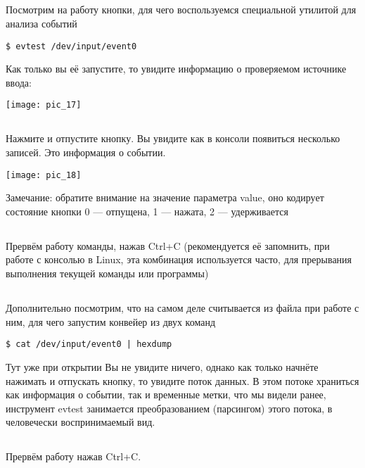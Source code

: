 \subsection{}Посмотрим на работу кнопки, для чего воспользуемся специальной утилитой для анализа событий
\begin{lstlisting}[style=bash]
$ evtest /dev/input/event0  
\end{lstlisting}
Как только вы её запустите, то увидите информацию о проверяемом источнике ввода:
\begin{center}
	\texttt{[image: pic\_17]}
\end{center}

\subsection{}Нажмите и отпустите кнопку. Вы увидите как в консоли появиться несколько записей. Это информация о событии. 
\begin{center}
	\texttt{[image: pic\_18]}
\end{center}
Замечание: обратите внимание на значение параметра value, оно кодирует состояние кнопки 0 — отпущена, 1 — нажата, 2 — удерживается  

\subsection{}Прервём работу команды, нажав Ctrl+C (рекомендуется её запомнить, при работе с консолью в Linux, эта комбинация используется часто, для прерывания выполнения текущей команды или программы)

\subsection{}Дополнительно посмотрим, что на самом деле считывается из файла при работе с ним, для чего запустим конвейер из двух команд
\begin{lstlisting}[style=bash]
$ cat /dev/input/event0 | hexdump 
\end{lstlisting}
Тут уже при открытии Вы не увидите ничего, однако как только начнёте нажимать и отпускать кнопку, то увидите поток данных. В этом потоке храниться как информация о событии, так и временные метки, что мы видели ранее, инструмент evtest занимается преобразованием (парсингом) этого потока, в человечески воспринимаемый вид. 

\subsection{}Прервём работу нажав Ctrl+C.

